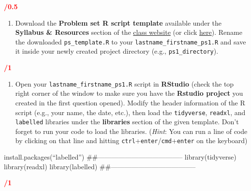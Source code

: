 \documentclass[
]{article}
\providecommand{\tightlist}{%
  \setlength{\itemsep}{0pt}\setlength{\parskip}{0pt}}
\begin{document}
\textcolor{red}{\textbf{/0.5}}

\begin{enumerate}
\def\labelenumi{\arabic{enumi}.}
\setcounter{enumi}{1}
\tightlist
\item
  Download the \textbf{Problem set R script template} available under
  the \textbf{Syllabus \& Resources} section of the
  \href{https://anyone-can-cook.github.io/rclass2/}{class website} (or
  click
  \href{https://anyone-can-cook.github.io/rclass2/assets/resources/ps_template.R}{here}).
  Rename the downloaded \texttt{ps\_template.R} to your
  \texttt{lastname\_firstname\_ps1.R} and save it inside your newly
  created project directory (e.g., \texttt{ps1\_directory}).
\end{enumerate}

\textcolor{red}{\textbf{/1}}

\begin{enumerate}
\def\labelenumi{\arabic{enumi}.}
\setcounter{enumi}{2}
\tightlist
\item
  Open your \texttt{lastname\_firstname\_ps1.R} script in
  \textbf{RStudio} (check the top right corner of the window to make
  sure you have the \textbf{Rstudio project} you created in the first
  question opened). Modify the header information of the R script (e.g.,
  your name, the date, etc.), then load the \texttt{tidyverse},
  \texttt{readxl}, and \texttt{labelled} libraries under the
  \textbf{libraries} section of the given template. Don't forget to run
  your code to load the libraries. (\emph{Hint}: You can run a line of
  code by clicking on that line and hitting
  \texttt{ctrl}+\texttt{enter}/\texttt{cmd}+\texttt{enter} on the
  keyboard)
\end{enumerate}

install.packages(``labelled'')
\#\#-------------------------------------- library(tidyverse)
library(readxl) library(labelled)
\#\#--------------------------------------

\textcolor{red}{\textbf{/1}}
\end{document}
